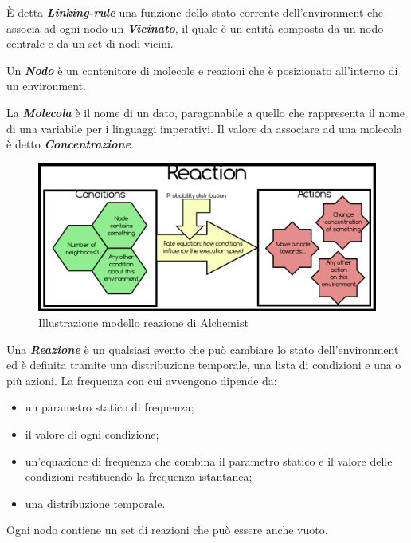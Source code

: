 È detta \textbf{\textit{Linking-rule}} una funzione dello stato corrente dell'environment che associa ad ogni nodo un \textbf{\textit{Vicinato}}, il quale è un entità composta da un nodo centrale e da un set di nodi vicini.

Un \textbf{\textit{Nodo}} è un contenitore di molecole e reazioni che è posizionato all'interno di un environment.

La \textbf{\textit{Molecola}} è il nome di un dato, paragonabile a quello che rappresenta il nome di una variabile per i linguaggi imperativi.
Il valore da associare ad una molecola è detto \textbf{\textit{Concentrazione}}.

\begin{figure} %
\begin{center} %
\includegraphics[width=14cm]{images/AlchemistReaction.png} %
\caption[Illustrazione modello reazione di Alchemist]{Illustrazione modello reazione di Alchemist} \label{fig:alchemistReaction}
\end{center}
\end{figure}

Una \textbf{\textit{Reazione}} è un qualsiasi evento che può cambiare lo stato dell'environment ed è definita tramite una distribuzione temporale, una lista di condizioni e una o più azioni.
La frequenza con cui avvengono dipende da:
\begin{itemize}
\item un parametro statico di frequenza;
\item il valore di ogni condizione;
\item un'equazione di frequenza che combina il parametro statico e il valore delle condizioni restituendo la frequenza istantanea;
\item una distribuzione temporale.
\end{itemize}
Ogni nodo contiene un set di reazioni che può essere anche vuoto.

